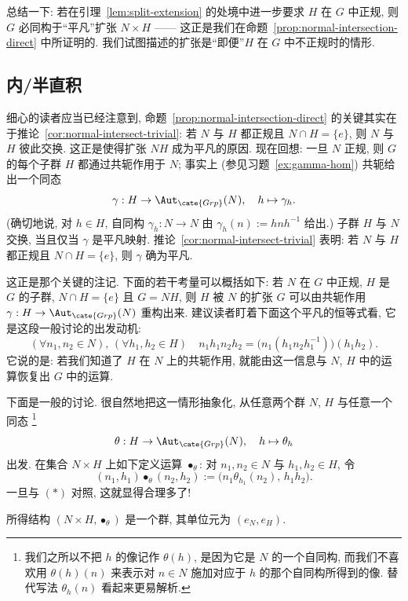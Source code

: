 总结一下: 若在引理~\ref{lem:split-extension} 的处境中进一步要求 $H$ 在 $G$ 中正规, 则 $G$ 必同构于``平凡''扩张 $N \times H$ —— 这正是我们在命题~\ref{prop:normal-intersection-direct} 中所证明的. 我们试图描述的扩张是``即便''$H$ 在 $G$ 中不正规时的情形.

\subsection{内/半直积}
\label{subsec:semidirect-products}

细心的读者应当已经注意到, 命题~\ref{prop:normal-intersection-direct} 的关键其实在于推论~\ref{cor:normal-intersect-trivial}: 若 $N$ 与 $H$ 都正规且 $N \cap H = \{e\}$, 则 $N$ 与 $H$ 彼此交换. 这正是使得扩张 $NH$ 成为平凡的原因. 现在回想: 一旦 $N$ 正规, 则 $G$ 的每个子群 $H$ 都通过共轭作用于 $N$; 事实上 (参见习题~\ref{ex:gamma-hom}) 共轭给出一个同态
\[
\gamma : H \to \Aut_{\cate{Grp}}(N), \quad h \mapsto \gamma_h.
\]
(确切地说, 对 $h \in H$, 自同构 $\gamma_h : N \to N$ 由 $\gamma_h(n) := h n h^{-1}$ 给出.) 子群 $H$ 与 $N$ 交换, 当且仅当 $\gamma$ 是平凡映射. 推论~\ref{cor:normal-intersect-trivial} 表明: 若 $N$ 与 $H$ 都正规且 $N \cap H = \{e\}$, 则 $\gamma$ 确为平凡.

这正是那个关键的注记. 下面的若干考量可以概括如下: 若 $N$ 在 $G$ 中正规, $H$ 是 $G$ 的子群, $N \cap H = \{e\}$ 且 $G = NH$, 则 $H$ 被 $N$ 的扩张 $G$ 可以由共轭作用 $\gamma : H \to \Aut_{\cate{Grp}}(N)$ 重构出来. 建议读者盯着下面这个平凡的恒等式看, 它是这段一般讨论的出发动机:
\begin{equation*}
(\forall n_1, n_2 \in N),\,(\forall h_1, h_2 \in H) \quad n_1 h_1 n_2 h_2 = \bigl(n_1 (h_1 n_2 h_1^{-1})\bigr) (h_1 h_2).\tag{*}
\end{equation*}
它说的是: 若我们知道了 $H$ 在 $N$ 上的共轭作用, 就能由这一信息与 $N$, $H$ 中的运算恢复出 $G$ 中的运算.

下面是一般的讨论. 很自然地把这一情形抽象化, 从任意两个群 $N$, $H$ 与任意一个同态%
\footnote{我们之所以不把 $h$ 的像记作 $\theta(h)$, 是因为它是 $N$ 的一个自同构, 而我们不喜欢用 $\theta(h)(n)$ 来表示对 $n \in N$ 施加对应于 $h$ 的那个自同构所得到的像. 替代写法 $\theta_h(n)$ 看起来更易解析.}%
\[
\theta : H \to \Aut_{\cate{Grp}}(N), \quad h \mapsto \theta_h
\]
出发. 在集合 $N \times H$ 上如下定义运算 $\bullet_{\theta}$: 对 $n_1, n_2 \in N$ 与 $h_1, h_2 \in H$, 令
\[
(n_1, h_1) \bullet_{\theta} (n_2, h_2) := \bigl(n_1 \theta_{h_1}(n_2),\, h_1 h_2\bigr).
\]
一旦与 $(*)$ 对照, 这就显得合理多了!

\begin{lemma}
\label{lem:semidirect-group}
所得结构 $(N \times H, \bullet_{\theta})$ 是一个群, 其单位元为 $(e_N, e_H)$.
\end{lemma}

